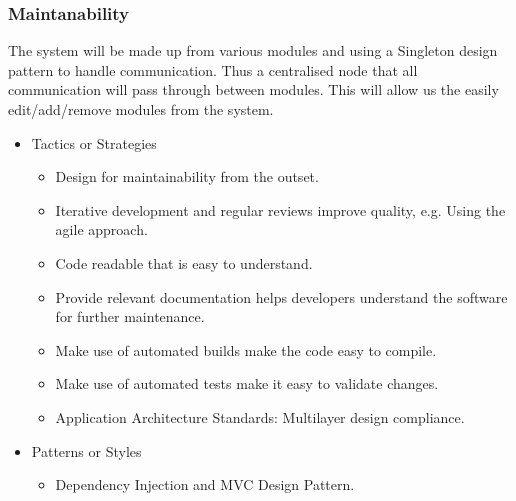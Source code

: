 \subsubsection{Maintanability}
		The system will be made up from various modules and using a Singleton design pattern to handle communication. Thus a centralised node that all communication will pass through between modules. This will allow us the easily edit/add/remove modules from the system.
		\begin{itemize}
	\item{Tactics or Strategies}
		\begin{itemize}
			\item Design for maintainability from the outset.
			\item Iterative development and regular reviews improve quality, e.g. Using the agile approach.
			\item Code readable that is easy to understand.
			\item Provide relevant documentation helps developers understand the software for further maintenance.
			\item Make use of automated builds make the code easy to compile.
			\item Make use of automated tests make it easy to validate changes.
			\item Application Architecture Standards: Multilayer design compliance.
		\end{itemize}
	\item{Patterns or Styles}
		\begin{itemize}
			\item Dependency Injection and MVC Design Pattern.
		\end{itemize}
\end{itemize}
